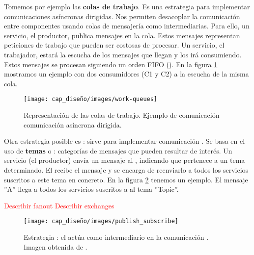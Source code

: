 Tomemos por ejemplo las \textbf{colas de trabajo}. \cite{royChapterMessagePatterns2017} Es una estrategia para implementar comunicaciones asíncronas dirigidas. Nos permiten desacoplar la comunicación entre componentes usando colas de mensajería como intermediarias. Para ello, un servicio, el productor, publica mensajes en la cola. Estos mensajes representan peticiones de trabajo que pueden ser costosas de procesar. Un servicio, el trabajador, estará la escucha de los mensajes que llegan y los irá consumiendo. Estos mensajes se procesan siguiendo un orden FIFO (). En la figura \ref{fig:work-queues} mostramos un ejemplo con dos consumidores (C1 y C2) a la escucha de la misma cola.

\begin{figure}[htb]
  \centering
  \texttt{[image: cap\_diseño/images/work-queues]}
  \caption[Representación de las colas de trabajo. Ejemplo de comunicación asíncrona dirigida.]{Representación de las colas de trabajo. Ejemplo de comunicación comunicación asíncrona dirigida. \footnotemark }
  \label{fig:work-queues}
\end{figure}


Otra estrategia posible es : sirve para implementar comunicación . Se basa en el uso de \textbf{temas} o \textbf{}: categorías de mensajes que pueden resultar de interés. Un servicio (el productor) envía un mensaje al , indicando que pertenece a un tema determinado. El  recibe el mensaje y se encarga de reenviarlo a todos los servicios suscritos a este tema en concreto. \cite{rabbitmqPublishSubscribeDocumentation} En la figura \ref{fig:publish-subscribe} tenemos un ejemplo. El mensaje ''A'' llega a todos los servicios suscritos a al tema ''Topic''.

\textcolor{red}{Describir fanout}
\textcolor{red}{Describir exchanges}

\begin{figure}[htb]
  \centering
  \texttt{[image: cap\_diseño/images/publish\_subscribe]}
  \caption[Estrategia : el  actúa como intermediario en la comunicación .]{Estrategia : el  actúa como intermediario en la comunicación . Imagen obtenida de \footnotemark.}
  \label{fig:publish-subscribe}
\end{figure}

